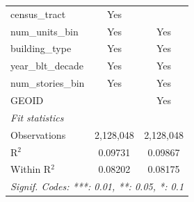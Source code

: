 \begin{tabular}{lcc}
   census\_tract                                                       & Yes             & \\  
   num\_units\_bin                                                     & Yes             & Yes\\  
   building\_type                                                      & Yes             & Yes\\  
   year\_blt\_decade                                                   & Yes             & Yes\\  
   num\_stories\_bin                                                   & Yes             & Yes\\  
   GEOID                                                               &                 & Yes\\  
   \midrule
   \emph{Fit statistics}\\
   Observations                                                        & 2,128,048       & 2,128,048\\  
   R$^2$                                                               & 0.09731         & 0.09867\\  
   Within R$^2$                                                        & 0.08202         & 0.08175\\  
   \midrule \midrule
   \multicolumn{3}{l}{\emph{Signif. Codes: ***: 0.01, **: 0.05, *: 0.1}}\\
\end{tabular}
\par\endgroup
\begingroup
\centering
